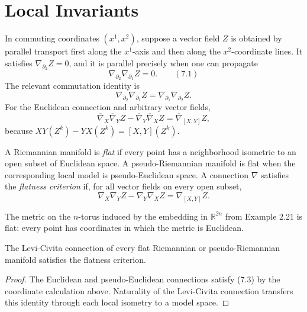 \section{Local Invariants}

In commuting coordinates $(x^1,x^2)$, suppose a vector field $Z$ is obtained
by parallel transport first along the $x^1$-axis and then along the
$x^2$-coordinate lines. It satisfies $\nabla_{\partial_2}Z=0$, and it is
parallel precisely when one can propagate
\[
\nabla_{\partial_2}\nabla_{\partial_1}Z=0. \qquad (7.1)
\]
The relevant commutation identity is
\begin{equation}
\nabla_{\partial_2}\nabla_{\partial_1}Z
=\nabla_{\partial_1}\nabla_{\partial_2}Z. \tag{7.2}
\end{equation}
For the Euclidean connection and arbitrary vector fields,
\[
\overline\nabla_X\overline\nabla_YZ
-\overline\nabla_Y\overline\nabla_XZ
=\overline\nabla_{[X,Y]}Z,
\]
because $XY(Z^k)-YX(Z^k)=[X,Y](Z^k)$.

A Riemannian manifold is \emph{flat} if every point has a neighborhood
isometric to an open subset of Euclidean space. A pseudo-Riemannian manifold is
flat when the corresponding local model is pseudo-Euclidean space. A
connection $\nabla$ satisfies the \emph{flatness criterion} if, for all vector
fields on every open subset,
\begin{equation}
\nabla_X\nabla_YZ-\nabla_Y\nabla_XZ=\nabla_{[X,Y]}Z. \tag{7.3}
\end{equation}

\begin{example}
\label{ex:n-torus-flat-metric}

The metric on the $n$-torus induced by the embedding in $\mathbb R^{2n}$ from
Example 2.21 is flat: every point has coordinates in which the metric is
Euclidean.
\end{example}

\begin{proposition}
\label{prop:flat-manifold-levi-civita-flatness}
The Levi-Civita connection of every flat Riemannian or pseudo-Riemannian
manifold satisfies the flatness criterion.
\end{proposition}

\begin{proof}
\sketch The Euclidean and pseudo-Euclidean connections satisfy (7.3) by the
coordinate calculation above. Naturality of the Levi-Civita connection
transfers this identity through each local isometry to a model space.
\end{proof}

